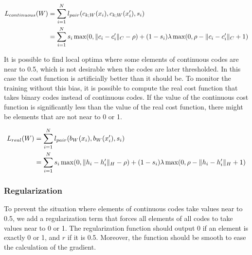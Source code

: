 \[
\begin{split}
L_{continuous}(W) & = \sum\limits_{i=1}^N l_{pair}(c_{k;W}(x_i), c_{k;W}(x'_i), s_i) \\
                  & = \sum\limits_{i=1}^N s_i\max(0, \lVert c_i - c'_i\rVert_{C} - \rho) + (1-s_i)\lambda\max(0, \rho - \lVert c_i - c'_i\rVert_{C} + 1)
\end{split}
\]

It is possible to find local optima where some elements of continuous codes are near to 0.5, which is not desirable when the codes are later thresholded. In this case the cost function is artificially better than it should be. To monitor the training without this bias, it is possible to compute the real cost function that takes binary codes instead of continuous codes. If the value of the continuous cost function is significantly less than the value of the real cost function, there might be elements that are not near to 0 or 1.

\[
\begin{split}
L_{real}(W) & = \sum\limits_{i=1}^N l_{pair}(b_{W}(x_i), b_{W}(x'_i), s_i) \\
            & = \sum\limits_{i=1}^N s_i\max(0, \lVert h_i - h'_i\rVert_{H} - \rho) + (1-s_i)\lambda\max(0, \rho - \lVert h_i - h'_i\rVert_{H} + 1)
\end{split}
\]

\subsubsection{Regularization}
To prevent the situation where elements of continuous codes take values near to 0.5, we add a regularization term that forces all elements of all codes to take values near to 0 or 1. The regularization function should output 0 if an element is exactly 0 or 1, and $r$ if it is 0.5. Moreover, the function should be smooth to ease the calculation of the gradient.

